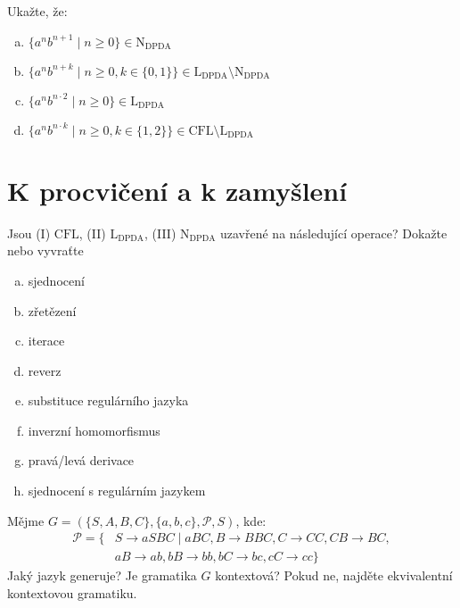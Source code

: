 \documentclass[a4paper,12pt]{amsart}
\begin{document}
\medskip\begin{problem}
    Ukažte, že:
    \begin{enumerate}[(a)]
        \item $\{a^nb^{n+1}\mid n\geq 0\}\in\mathrm{N_{DPDA}}$
        \item $\{a^nb^{n+k}\mid n\geq 0,k\in\{0,1\}\}\in\mathrm{L_{DPDA}}\setminus\mathrm{N_{DPDA}}$
        \item $\{a^nb^{n\cdot 2}\mid n\geq 0\}\in\mathrm{L_{DPDA}}$
        \item $\{a^nb^{n\cdot k}\mid n\geq 0,k\in\{1,2\}\}\in\mathrm{CFL}\setminus\mathrm{L_{DPDA}}$
    \end{enumerate}
\end{problem}


\section*{K procvičení a k zamyšlení}


\medskip\begin{problem}
    
    Jsou (I) $\mathrm{CFL}$, (II) $\mathrm{L_{DPDA}}$, (III) $\mathrm{N_{DPDA}}$ uzavřené na následující operace? Dokažte nebo vyvraťte       

    \begin{multicols}{2}
        \begin{enumerate}[(a)]
            \item sjednocení
            \item zřetězení
            \item iterace
            \item reverz
            \item substituce regulárního jazyka
            \item inverzní homomorfismus
            \item pravá/levá derivace
            \item sjednocení s regulárním jazykem
        \end{enumerate}    
    \end{multicols}    

\end{problem}


\begin{problem}
    
    Mějme $G=(\{S,A,B,C\},\{a,b,c\},\mathcal P,S)$, kde:
    \begin{align*}
        \mathcal P=\{&S\rightarrow aSBC\mid aBC, B\rightarrow BBC,  C\rightarrow CC, CB\rightarrow BC,\\ 
        &aB\rightarrow ab, bB\rightarrow bb, bC\rightarrow bc, cC\rightarrow cc\}
    \end{align*}
    Jaký jazyk generuje? Je gramatika $G$ kontextová? Pokud ne, najděte ekvivalentní kontextovou gramatiku.
    
\end{problem}
\end{document}
